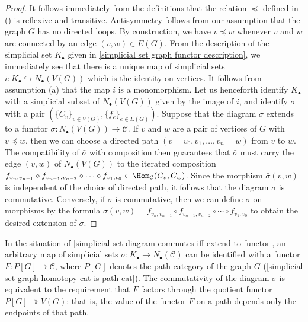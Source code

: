 \begin{proof}
It follows immediately from the definitions that the relation $\preceq$ defined in () is reflexive and transitive. Antisymmetry follows from our assumption that the graph $G$ has no directed loops. By construction, we have $v\preceq w$ whenever $v$ and $w$ are connected by an edge $(v,w)\in E(G)$. From the description of the simplicial set $K_\bullet$ given in \cref{simplicial set graph functor description}, we immediately see that there is a unique map of simplicial sets $i:K_\bullet\hookrightarrow N_\bullet(V(G))$ which is the identity on vertices. It follows from assumption (a) that the map $i$ is a monomorphism. Let us henceforth identify $K_\bullet$ with a simplicial subset of $N_\bullet(V(G))$ given by the image of $i$, and identify $\sigma$ with a pair $(\{C_v\}_{v\in V(G)},\{f_e\}_{e\in E(G)})$. Suppose that the diagram $\sigma$ extends to a functor $\bar{\sigma}:N_\bullet(V(G))\to\mathcal{C}$. If $v$ and $w$ are a pair of vertices of $G$ with $v\preceq w$, then we can choose a directed path $(v=v_0,v_1,\dots,v_n=w)$ from $v$ to $w$. The compatibility of $\bar{\sigma}$ with composition then guarantees that $\bar{\sigma}$ must carry the edge $(v,w)$ of $N_\bullet(V(G))$ to the iterated composition $f_{v_n,v_{n-1}}\circ f_{v_{n-1},v_{n-2}}\circ\cdots\circ f_{v_1,v_0}\in\Hom_{\mathcal{C}}(C_v,C_w)$. Since the morphism $\bar{\sigma}(v,w)$ is independent of the choice of directed path, it follows that the diagram $\sigma$ is commutative. Conversely, if $\bar{\sigma}$ is commutative, then we can define $\bar{\sigma}$ on morphisms by the formula $\bar{\sigma}(v,w)=f_{v_n,v_{n-1}}\circ f_{v_{n-1},v_{n-2}}\circ\cdots\circ f_{v_1,v_0}$ to obtain the desired extension of $\sigma$.
\end{proof}
\begin{remark}
In the situation of \cref{simplicial set diagram commutes iff extend to functor}, an arbitrary map of simplicial sets $\sigma:K_\bullet\to N_\bullet(\mathcal{C})$ can be identified with a functor $F:P[G]\to\mathcal{C}$, where $P[G]$ denotes the path category of the graph $G$ (\cref{simplicial set graph homotopy cat is path cat}). The commutativity of the diagram $\sigma$ is equivalent to the requirement that $F$ factors through the quotient functor $P[G]\twoheadrightarrow V(G)$: that is, the value of the functor $F$ on a path depends only the endpoints of that path.
\end{remark}
